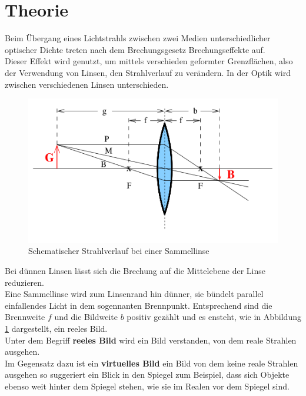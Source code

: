 \section{Theorie}
\label{sec:Theorie}
Beim Übergang eines Lichtstrahls zwischen zwei Medien unterschiedlicher optischer Dichte treten nach dem Brechungsgesetz Brechungseffekte auf.\\
Dieser Effekt wird genutzt, um mittels verschieden geformter Grenzflächen, also der Verwendung von Linsen, den Strahlverlauf zu verändern.
In der Optik wird zwischen verschiedenen Linsen unterschieden.
\begin{figure}
  \includegraphics[width=\linewidth]{Bilder/sammellinse.png}
  \caption{Schematischer Strahlverlauf bei einer Sammellinse \cite{Anleitung}}
  \label{fig:sammelli}
\end{figure}
\FloatBarrier
Bei dünnen Linsen lässt sich die Brechung auf die Mittelebene der Linse reduzieren.\\
Eine Sammellinse wird zum Linsenrand hin dünner, sie bündelt parallel einfallendes Licht in dem sogennanten Brennpunkt. Entsprechend sind die Brennweite $f$ und die Bildweite $b$ positiv gezählt und es ensteht, wie in Abbildung \ref{fig:sammelli} dargestellt, ein reeles Bild.
\\Unter dem Begriff \textbf{reeles Bild} wird ein Bild verstanden, von dem reale Strahlen ausgehen.
\\Im Gegensatz dazu ist ein \textbf{virtuelles Bild} ein Bild von dem keine reale Strahlen ausgehen so suggeriert ein Blick in den Spiegel zum Beispiel, dass sich Objekte ebenso weit hinter dem Spiegel stehen, wie sie im Realen vor dem Spiegel sind.

